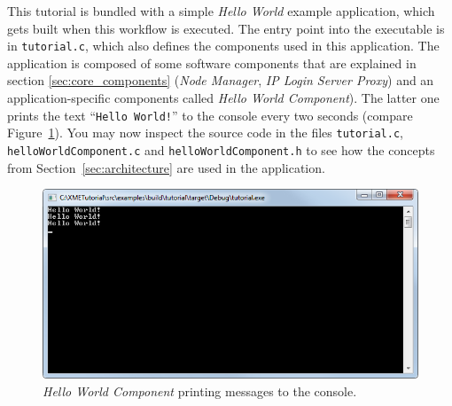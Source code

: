 This tutorial is bundled with a simple \emph{Hello World} example application, which gets built when this workflow is executed.
The entry point into the executable is in \verb|tutorial.c|, which also defines the \xme components used in this application.
The application is composed of some software components that are explained in section \ref{sec:core_components}
(\emph{Node Manager}, \emph{IP Login Server Proxy}) and an application-specific components called \emph{Hello World Component}).
The latter one prints the text ``\texttt{Hello World!}'' to the console every two seconds (compare Figure~\ref{fig:example_hello_world}).
%
You may now inspect the source code in the files \verb|tutorial.c|, \verb|helloWorldComponent.c| and \verb|helloWorldComponent.h|
to see how the concepts from Section~\ref{sec:architecture} are used in the application.

\begin{figure}[htpb]
	\centering
	\includegraphics[scale=0.75]{figures/PNG/example_hello_world.png}
	\caption{\emph{Hello World Component} printing messages to the console.}
	\label{fig:example_hello_world}
\end{figure}
